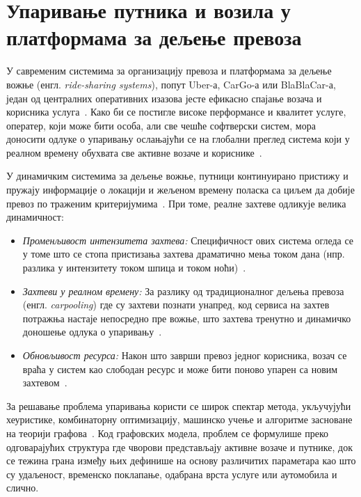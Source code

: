 \section{Упаривање путника и возила у платформама за дељење превоза}

У савременим системима за организацију превоза и платформама за дељење вожње (енгл. \textit{ride-sharing systems}), попут Uber-а, CarGo-а или BlaBlaCar-а, један од централних оперативних изазова јесте ефикасно спајање возача и корисника услуга~\cite{dickersonAllocationProblemsRidesharing2021}. Како би се постигле високе перформансе и квалитет услуге, оператер, који може бити особа, али све чешће софтверски систем,  мора доносити одлуке о упаривању ослањајући се на глобални преглед система који у реалном времену обухвата све активне возаче и кориснике~\cite{tafreshianTripbasedGraphPartitioning2020}.

У динамичким системима за дељење вожње, путници континуирано пристижу и пружају информације о локацији и жељеном времену поласка са циљем да добије превоз по траженим критеријумима~\cite{tafreshianTripbasedGraphPartitioning2020}. При томе, реалне захтеве одликује велика динамичност:
\begin{itemize}
    \item \textit{Променљивост интензитета захтева:} Специфичност ових система огледа се у томе што се стопа пристизања захтева драматично мења током дана (нпр. разлика у интензитету током шпица и током ноћи)~\cite{dickersonAllocationProblemsRidesharing2021}.
    \item \textit{Захтеви у реалном времену:} За разлику од традиционалног дељења превоза (енгл. \textit{carpooling}) где су захтеви познати унапред, код сервиса на захтев потражња настаје непосредно пре вожње, што захтева тренутно и динамичко доношење одлука о упаривању~\cite{dongComparingPerformanceCollaborative2024}.
    \item \textit{Обновљивост ресурса:} Након што заврши превоз једног корисника, возач се враћа у систем као слободан ресурс и може бити поново упарен са новим захтевом~\cite{dickersonAllocationProblemsRidesharing2021}.
\end{itemize}

За решавање проблема упаривања користи се широк спектар метода, укључујући хеуристике, комбинаторну оптимизацију, машинско учење и алгоритме засноване на теорији графова~\cite{dongComparingPerformanceCollaborative2024}. Код графовских модела, проблем се формулише преко одговарајућих структура где чворови представљају активне возаче и путнике, док се тежина грана између њих дефинише на основу различитих параметара као што су удаљеност, временско поклапање, одабрана врста услуге или аутомобила и слично.

